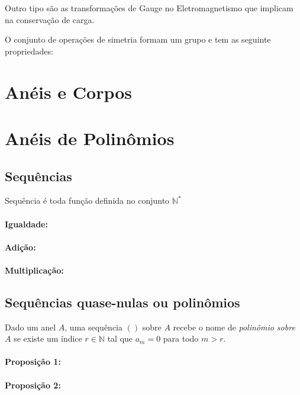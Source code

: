 Outro tipo são as transformações de Gauge no Eletromagnetismo que implicam na conservação de carga.

O conjunto de operações de simetria formam um grupo e tem as seguinte propriedades:


\section{Anéis e Corpos}

\section{Anéis de Polinômios}

\subsection{Sequências}
\begin{defi}
Sequência é toda função definida no conjunto $\mathbb{N}^*$
\end{defi}

\paragraph{Igualdade:}

\paragraph{Adição:}

\paragraph{Multiplicação:}

\subsection{Sequências quase-nulas ou polinômios}

\begin{defi}
Dado um anel $A$, uma sequência $()$ sobre $A$ recebe o nome de \textit{polinômio sobre $A$} se existe um índice $r\in \mathbb{N}$ tal que $a_m=0$ para todo $m> r$.
\end{defi}

\paragraph{Proposição 1:}

\paragraph{Proposição 2:}

